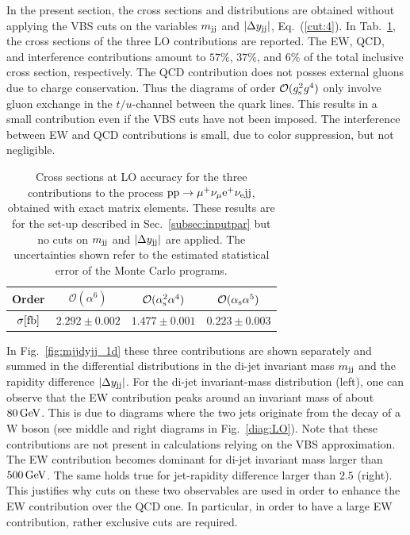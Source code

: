 In the present section, the cross sections and distributions are obtained without applying the VBS cuts on the variables $m_{\text{j}\text{j}}$ and $|\Delta y_{\text{j}\text{j}}|$, 
Eq.~(\ref{cut:4}).
In Tab.~\ref{tab:LOscanXsec}, the cross sections of the three LO contributions are reported.
The EW, QCD, and interference contributions amount to $57\%$, $37\%$, and $6\%$ of the total inclusive cross section, respectively.
The QCD contribution does not posses external gluons due to charge conservation.
Thus the diagrams of order $\mathcal{O}(g_{\rm s}^2g^4)$ only involve gluon exchange in the $t/u$-channel between the quark lines.
This results in a small contribution even if the VBS cuts have not been imposed.
The interference between EW and QCD contributions is small, due to color suppression, but not negligible.

\begin{table}[h!]
    \centering
    \begin{tabular}{c|c|c|c}
        Order & $\mathcal{O}(\alpha^6)$ & $\mathcal{O}(\alpha_\text{s}^2\alpha^4)$ & $\mathcal{O}(\alpha_\text{s}\alpha^5)$ \\
        \hline
        \hline
        $\sigma[\rm{fb}]$ & $ 2.292 \pm 0.002 $ & $ 1.477 \pm 0.001 $ & $ 0.223 \pm 0.003 $ \\
    \end{tabular}
    \caption{\label{tab:LOscanXsec} Cross sections at LO accuracy for the three contributions to the process ${\rm p}{\rm p}\to\mu^+\nu_\mu{\rm e}^+\nu_{\rm e}{\rm j}{\rm j}$, obtained with exact matrix elements.
    These results are for the set-up described in Sec.~\ref{subsec:inputpar} but no cuts on $m_{\text{j}\text{j}}$ and $|\Delta y_{\text{j}\text{j}}|$ are applied.
    The uncertainties shown refer to the estimated statistical error of the Monte Carlo programs.}
\end{table}

In Fig.~\ref{fig:mjjdyjj_1d} these three contributions are shown separately and summed in the differential distributions in the di-jet invariant mass $m_{\text{j}\text{j}}$ and the rapidity difference $|\Delta y_{\text{j}\text{j}}|$.
For the di-jet invariant-mass  distribution (left), one can observe that the EW contribution peaks around an invariant mass of about $80\,\text{GeV}$.
This is due to diagrams where the two jets originate from the decay of a W boson (see middle and right diagrams in Fig.~\ref{diag:LO}).
Note that these contributions are not present in calculations relying on the VBS approximation.
The EW contribution becomes dominant for di-jet invariant mass larger than $500\,\text{GeV}$.
The same holds true for jet-rapidity difference larger than $2.5$ (right).
This justifies why cuts on these two observables are used in order to enhance the EW contribution over the QCD one.
In particular, in order to have a large EW contribution, rather exclusive cuts are required.

